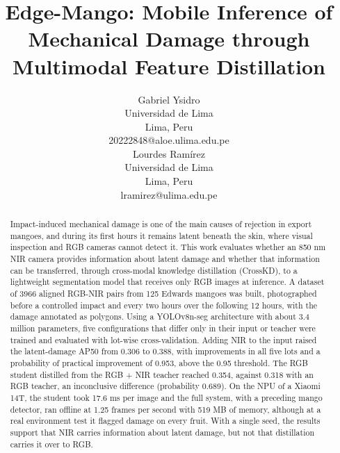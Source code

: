 \documentclass[journal]{IEEEtran}
\begin{document}
\title{Edge-Mango: Mobile Inference of Mechanical Damage through Multimodal Feature Distillation}

\author{%
\begin{tabular}[t]{c}
Gabriel Ysidro\\
Universidad de Lima\\
Lima, Peru\\
20222848@aloe.ulima.edu.pe
\end{tabular}
\hspace{3em}
\begin{tabular}[t]{c}
Lourdes Ram\'irez\\
Universidad de Lima\\
Lima, Peru\\
lramirez@ulima.edu.pe
\end{tabular}}

\maketitle

\begin{abstract}
Impact-induced mechanical damage is one of the main causes of rejection in export mangoes, and during its first hours it remains latent beneath the skin, where visual inspection and RGB cameras cannot detect it. This work evaluates whether an 850 nm NIR camera provides information about latent damage and whether that information can be transferred, through cross-modal knowledge distillation (CrossKD), to a lightweight segmentation model that receives only RGB images at inference. A dataset of 3966 aligned RGB-NIR pairs from 125 Edwards mangoes was built, photographed before a controlled impact and every two hours over the following 12 hours, with the damage annotated as polygons. Using a YOLOv8n-seg architecture with about 3.4 million parameters, five configurations that differ only in their input or teacher were trained and evaluated with lot-wise cross-validation. Adding NIR to the input raised the latent-damage AP50 from 0.306 to 0.388, with improvements in all five lots and a probability of practical improvement of 0.953, above the 0.95 threshold. The RGB student distilled from the RGB + NIR teacher reached 0.354, against 0.318 with an RGB teacher, an inconclusive difference (probability 0.689). On the NPU of a Xiaomi 14T, the student took 17.6 ms per image and the full system, with a preceding mango detector, ran offline at 1.25 frames per second with 519 MB of memory, although at a real environment test it flagged damage on every fruit. With a single seed, the results support that NIR carries information about latent damage, but not that distillation carries it over to RGB.
\end{abstract}
\end{document}
